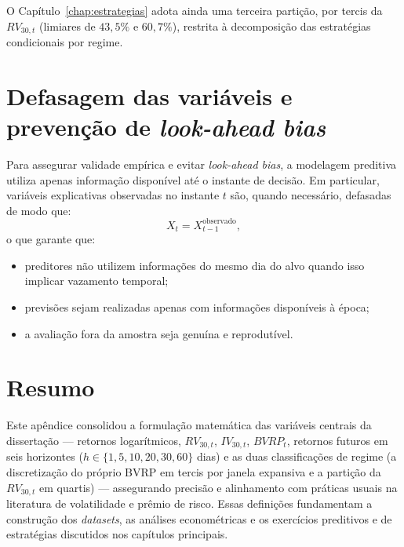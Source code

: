 O Capítulo~\ref{chap:estrategias} adota ainda uma terceira partição, por
tercis da $RV_{30,t}$ (limiares de $43{,}5\%$ e $60{,}7\%$), restrita à
decomposição das estratégias condicionais por regime.

\section{Defasagem das variáveis e prevenção de \textit{look-ahead bias}}

Para assegurar validade empírica e evitar \textit{look-ahead bias}, a modelagem
preditiva utiliza apenas informação disponível até o instante de decisão. Em
particular, variáveis explicativas observadas no instante $t$ são, quando necessário,
defasadas de modo que:
\[
X_t = X^{\text{observado}}_{t-1},
\]
o que garante que:
\begin{itemize}
    \item preditores não utilizem informações do mesmo dia do alvo quando isso implicar
    vazamento temporal;
    \item previsões sejam realizadas apenas com informações disponíveis à época;
    \item a avaliação fora da amostra seja genuína e reprodutível.
\end{itemize}

\section{Resumo}

Este apêndice consolidou a formulação matemática das variáveis centrais da
dissertação --- retornos logarítmicos, $RV_{30,t}$, $IV_{30,t}$, $BVRP_t$,
retornos futuros em seis horizontes ($h \in \{1,5,10,20,30,60\}$ dias) e
as duas classificações de regime (a discretização do próprio BVRP em
tercis por janela expansiva e a partição da $RV_{30,t}$ em quartis)
--- assegurando precisão e alinhamento com práticas usuais na literatura de
volatilidade e prêmio de risco. Essas definições fundamentam a construção dos
\textit{datasets}, as análises econométricas e os exercícios preditivos e de
estratégias discutidos nos capítulos principais.
